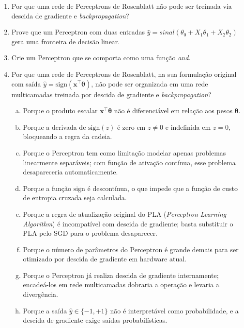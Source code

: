 \documentclass{dlproblemset}
\begin{document}
\begin{enumerate}[1)]
    \item Por que uma rede de Perceptrons de Rosenblatt não pode ser treinada via descida de gradiente e \textit{backpropagation}?

    \item Prove que um Perceptron com duas entradas $\hat{y}=sinal(\theta_0 + X_1\theta_1 + X_2\theta_2)$ gera uma fronteira de decisão linear.

    \item Crie um Perceptron que se comporta como uma função \textit{and}.

    \item Por que uma rede de Perceptrons de Rosenblatt, na sua formulação original com saída $\hat{y} = \mathrm{sign}(\mathbf{x}^\top \boldsymbol{\theta})$, não pode ser organizada em uma rede multicamadas treinada por descida de gradiente e \textit{backpropagation}?
    \begin{enumerate}[(a)]
        \item Porque o produto escalar $\mathbf{x}^\top \boldsymbol{\theta}$ não é diferenciável em relação aos pesos $\boldsymbol{\theta}$.
        \item Porque a derivada de $\mathrm{sign}(z)$ é zero em $z \neq 0$ e indefinida em $z = 0$, bloqueando a regra da cadeia.
        \item Porque o Perceptron tem como limitação modelar apenas problemas linearmente separáveis; com função de ativação contínua, esse problema desapareceria automaticamente.
        \item Porque a função $\mathrm{sign}$ é descontínua, o que impede que a função de custo de entropia cruzada seja calculada.
        \item Porque a regra de atualização original do PLA (\textit{Perceptron Learning Algorithm}) é incompatível com descida de gradiente; basta substituir o PLA pelo SGD para o problema desaparecer.
        \item Porque o número de parâmetros do Perceptron é grande demais para ser otimizado por descida de gradiente em hardware atual.
        \item Porque o Perceptron já realiza descida de gradiente internamente; encadeá-los em rede multicamadas dobraria a operação e levaria a divergência.
        \item Porque a saída $\hat{y} \in \{-1, +1\}$ não é interpretável como probabilidade, e a descida de gradiente exige saídas probabilísticas.
    \end{enumerate}


\end{enumerate}
\end{document}
